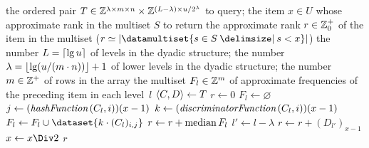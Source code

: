 \begin{algorithmic}[1]
  \In the ordered pair \( \cramped{T \in \integers^{\lambda \times m \times n} \times \integers^{(L - \lambda) \times u / 2^{\lambda}}} \) to query; the item \( x \in U \) whose approximate rank in the multiset \( S \) to return
  \Out the approximate rank \( r \in \mathbb{Z}_{0}^{+} \) of the item in the multiset (\( r \simeq \cardinality{\datamultiset{s \in S \suchthat s < x}} \))
  \Constant the number \( L = \lceil\lg u\rceil \) of levels in the dyadic structure; the number \( \lambda = \lfloor\lg (u / (m \cdot n))\rfloor + 1 \) of lower levels in the dyadic structure; the number \( m \in \mathbb{Z}^{+} \) of rows in the array
  \Local the multiset \( F_{l} \in \mathbb{Z}^{m} \) of approximate frequencies of the preceding item in each level~\( l \)
    \State \( \langle C, D\rangle \gets T \)
    \State \( r \gets 0 \)
        \State \( F_{l} \gets \varnothing \)
            \State \( j \gets (\hashFunction (C_{l}, i))(x - 1) \)
            \State \( k \gets (\discriminatorFunction (C_{l}, i))(x - 1) \)
            \State \( F_{l} \gets F_{l} \cup \dataset{k \cdot (C_{l})_{i, j}} \)
          \EndFor
          \State \( r \gets r + \operatorname*{median} F_{l} \)
        \Else
          \State \( l' \gets l - \lambda \)
          \State \( r \gets r + (D_{l'})_{x - 1} \)
        \EndIf
      \EndIf
      \State \( x \gets x \Div 2 \)
    \EndFor
    \State \Return \( r \)
  \EndFunction
\end{algorithmic}
